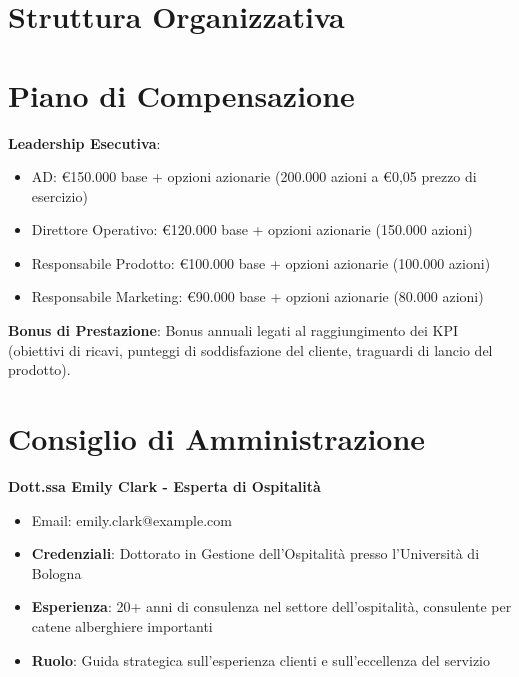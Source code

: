 \documentclass[11pt,a4paper]{report}
\begin{document}
\section{Struttura Organizzativa}
\begin{center}
\end{center}

\section{Piano di Compensazione}
\textbf{Leadership Esecutiva}:
\begin{itemize}
    \item AD: €150.000 base + opzioni azionarie (200.000 azioni a \euro{}0,05 prezzo di esercizio)
    \item Direttore Operativo: €120.000 base + opzioni azionarie (150.000 azioni)
    \item Responsabile Prodotto: €100.000 base + opzioni azionarie (100.000 azioni)
    \item Responsabile Marketing: €90.000 base + opzioni azionarie (80.000 azioni)
\end{itemize}

\textbf{Bonus di Prestazione}: Bonus annuali legati al raggiungimento dei KPI (obiettivi di ricavi, punteggi di soddisfazione del cliente, traguardi di lancio del prodotto).

\section{Consiglio di Amministrazione}

\textbf{Dott.ssa Emily Clark - Esperta di Ospitalità}
\begin{itemize}
    \item Email: emily.clark@example.com
    \item \textbf{Credenziali}: Dottorato in Gestione dell'Ospitalità presso l'Università di Bologna
    \item \textbf{Esperienza}: 20+ anni di consulenza nel settore dell'ospitalità, consulente per catene alberghiere importanti
    \item \textbf{Ruolo}: Guida strategica sull'esperienza clienti e sull'eccellenza del servizio
\end{itemize}
\end{document}
